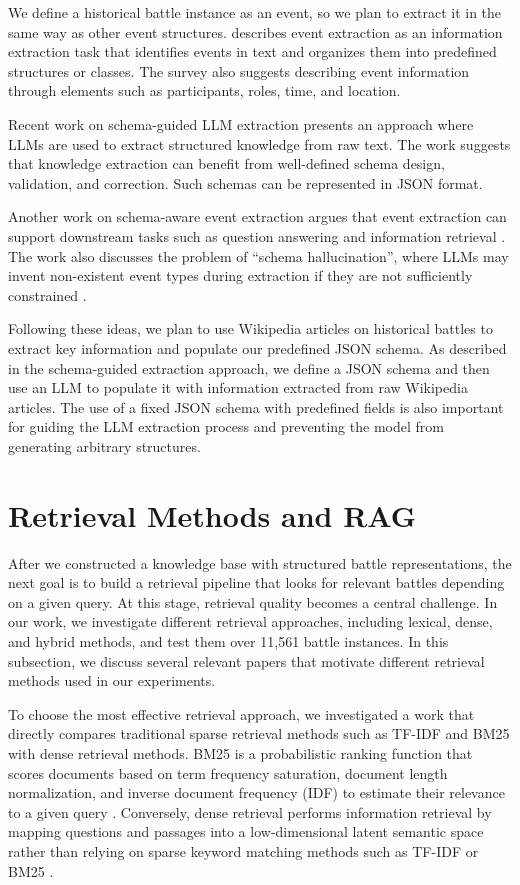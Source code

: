 We define a historical battle instance as an event, so we plan to extract it in the same way as other event structures. \citet{lai2022eventextraction} describes event extraction as an information extraction task that identifies events in text and organizes them into predefined structures or classes. The survey also suggests describing event information through elements such as participants, roles, time, and location.

Recent work on schema-guided LLM extraction \citep{luo2025oneke} presents an approach where LLMs are used to extract structured knowledge from raw text. The work suggests that knowledge extraction can benefit from well-defined schema design, validation, and correction. Such schemas can be represented in JSON format.

Another work on schema-aware event extraction argues that event extraction can support downstream tasks such as question answering and information retrieval \citep{liang2025asee}. The work also discusses the problem of “schema hallucination”, where LLMs may invent non-existent event types during extraction if they are not sufficiently constrained \citep{liang2025asee}. 

Following these ideas, we plan to use Wikipedia articles on historical battles to extract key information and populate our predefined JSON schema. As described in the schema-guided extraction approach, we define a JSON schema and then use an LLM to populate it with information extracted from raw Wikipedia articles. The use of a fixed JSON schema with predefined fields is also important for guiding the LLM extraction process and preventing the model from generating arbitrary structures.
\section{Retrieval Methods and RAG}
After we constructed a knowledge base with structured battle representations, the next goal is to build a retrieval pipeline that looks for relevant battles depending on a given query. At this stage, retrieval quality becomes a central challenge. In our work, we investigate different retrieval approaches, including lexical, dense, and hybrid methods, and test them over 11,561 battle instances. In this subsection, we discuss several relevant papers that motivate different retrieval methods used in our experiments.

To choose the most effective retrieval approach, we investigated a work that directly compares traditional sparse retrieval methods such as TF-IDF and BM25 with dense retrieval methods. BM25 is a probabilistic ranking function that scores documents based on term frequency saturation, document length normalization, and inverse document frequency (IDF) to estimate their relevance to a given query \citep{robertson2009bm25}. Conversely, dense retrieval performs information retrieval by mapping questions and passages into a low-dimensional latent semantic space rather than relying on sparse keyword matching methods such as TF-IDF or BM25 \citep{karpukhin2020dpr}.

